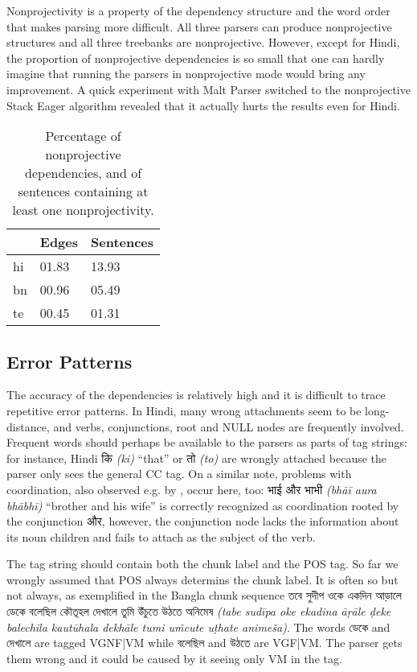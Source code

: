\documentclass[11pt]{article}
\newcommand{\hi}[1]{{\hifont #1}}
\newcommand{\bn}[1]{{\bnfont #1}}
\newcommand{\translit}[1]{{\translitfont \textit{(#1)}}}
\begin{document}
Nonprojectivity is a property of the dependency structure and the word order \citep{neproj} that makes parsing more difficult. All three parsers can produce nonprojective structures and all three treebanks are nonprojective. However, except for Hindi, the proportion of nonprojective dependencies is so small that one can hardly imagine that running the parsers in nonprojective mode would bring any improvement. A quick experiment with Malt Parser switched to the nonprojective Stack Eager algorithm revealed that it actually hurts the results even for Hindi.

\begin{table}[ht]
\begin{centering}
\begin{tabular}{l|ll}
& \textbf{Edges} & \textbf{Sentences} \\
\hline
hi & 01.83 & 13.93\\
bn & 00.96 & 05.49\\
te & 00.45 & 01.31\\
\end{tabular}
\caption{Percentage of nonprojective dependencies, and of sentences containing at least one nonprojectivity.}
\label{tab:nonprojectivity}
\end{centering}
\end{table}

\subsection{Error Patterns}
\label{sec:errors}

The accuracy of the dependencies is relatively high and it is difficult to trace repetitive error patterns. In Hindi, many wrong attachments seem to be long-distance, and verbs, conjunctions, root and NULL nodes are frequently involved. Frequent words should perhaps be available to the parsers as parts of tag strings: for instance, Hindi \hi{कि} \translit{ki} ``that'' or \hi{तो} \translit{to} are wrongly attached because the parser only sees the general CC tag. On a similar note, problems with coordination, also observed e.g. by \citet{dzparser}, occur here, too: \hi{भाई और भाभी} \translit{bhāī aura bhābhī} ``brother and his wife'' is correctly recognized as coordination rooted by the conjunction \hi{और}, however, the conjunction node lacks the information about its noun children and fails to attach as the subject of the verb.

The tag string should contain both the chunk label and the POS tag. So far we wrongly assumed that POS always determins the chunk label. It is often so but not always, as exemplified in the Bangla chunk sequence \bn{তবে সুদীপ ওকে একদিন আড়ালে ডেকে বলেছিল কৌতূহল দেখালে তুমি উঁচুতে উঠতে অনিমেষ} \translit{tabe sudīpa oke ekadina āṛāle ḍeke balechila kautūhala dekhāle tumi um̃cute uṭhate animeša}. The words \bn{ডেকে} and \bn{দেখালে} are tagged VGNF|VM while \bn{বলেছিল} and \bn{উঠতে} are VGF|VM. The parser gets them wrong and it could be caused by it seeing only VM in the tag.
\end{document}
